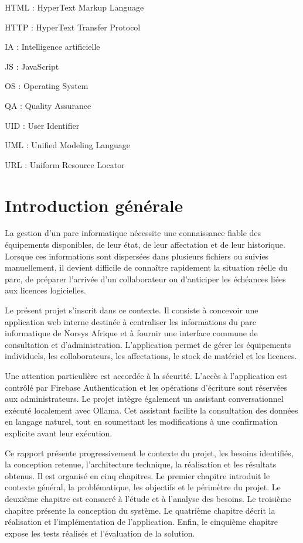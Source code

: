 \documentclass{rapportENSIAS}
\begin{document}
HTML : HyperText Markup Language

HTTP : HyperText Transfer Protocol

IA : Intelligence artificielle

JS : JavaScript

OS : Operating System

QA : Quality Assurance

UID : User Identifier

UML : Unified Modeling Language

URL : Uniform Resource Locator




\newpage
\chapter*{Introduction générale}

La gestion d’un parc informatique nécessite une connaissance fiable des équipements disponibles, de leur état, de leur affectation et de leur historique. Lorsque ces informations sont dispersées dans plusieurs fichiers ou suivies manuellement, il devient difficile de connaître rapidement la situation réelle du parc, de préparer l’arrivée d’un collaborateur ou d’anticiper les échéances liées aux licences logicielles.

Le présent projet s’inscrit dans ce contexte. Il consiste à concevoir une application web interne destinée à centraliser les informations du parc informatique de Norsys Afrique et à fournir une interface commune de consultation et d’administration. L’application permet de gérer les équipements individuels, les collaborateurs, les affectations, le stock de matériel et les licences.

Une attention particulière est accordée à la sécurité. L’accès à l’application est contrôlé par Firebase Authentication et les opérations d’écriture sont réservées aux administrateurs. Le projet intègre également un assistant conversationnel exécuté localement avec Ollama. Cet assistant facilite la consultation des données en langage naturel, tout en soumettant les modifications à une confirmation explicite avant leur exécution.

Ce rapport présente progressivement le contexte du projet, les besoins identifiés, la conception retenue, l’architecture technique, la réalisation et les résultats obtenus. Il est organisé en cinq chapitres. Le premier chapitre introduit le contexte général, la problématique, les objectifs et le périmètre du projet. Le deuxième chapitre est consacré à l’étude et à l’analyse des besoins. Le troisième chapitre présente la conception du système. Le quatrième chapitre décrit la réalisation et l’implémentation de l’application. Enfin, le cinquième chapitre expose les tests réalisés et l’évaluation de la solution.
\end{document}
